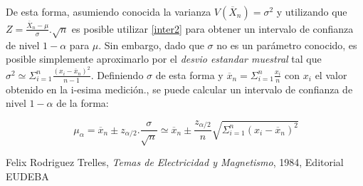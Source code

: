 \documentclass[11pt,a4paper]{article}
\begin{document}
De esta forma, asumiendo conocida la varianza $V(\overline{X}_n) = \sigma^2$ y utilizando que $Z = \frac{\overline{X}_n-\mu}{\sigma}.\sqrt{n}$ es posible utilizar \eqref{inter2} para obtener un intervalo de confianza de nivel $1-\alpha$ para $\mu$. Sin embargo, dado que $\sigma$ no es un parámetro conocido, es posible simplemente aproximarlo por el \textit{desvio estandar muestral} tal que $\sigma^2 \simeq \Sigma_{i=1}^{n}\frac{(x_i-\overline{x}_n)^2}{n-1}$. Definiendo $\sigma$ de esta forma y $\overline{x}_n = \Sigma_{i=1}^{n} \frac{x_i}{n}$ con $x_i$ el valor obtenido en la i-esima medición., se puede calcular un intervalo de confianza de nivel $1-\alpha$ de la forma:

\begin{equation}\label{inter_final}
\ \mu_{\alpha} = \overline{x}_n \pm z_{\alpha/2}.\frac{\sigma}{\sqrt{n}} \simeq \overline{x}_n \pm \frac{z_{\alpha/2}}{n} \sqrt{\Sigma_{i=1}^{n}(x_i-\overline{x}_n)^2}
\end{equation}



\begin{thebibliography}{1}
  Felix Rodriguez Trelles, \textit{Temas de Electricidad y Magnetismo}, 1984, Editorial EUDEBA
\end{thebibliography}
 
\end{document}

